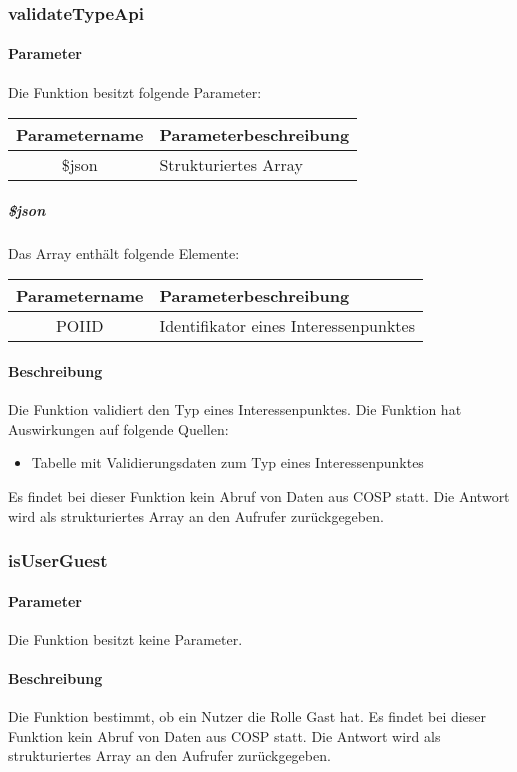 \subsubsection{validateTypeApi}
\paragraph{Parameter} Die Funktion besitzt folgende Parameter:
\begin{table}[H]
	\begin{tabular}{|c|p{11cm}|}
		\hline
		\textbf{Parametername} & \textbf{Parameterbeschreibung} \\ \hline
		\$json & Strukturiertes Array \\ \hline
	\end{tabular}
\end{table}
\subparagraph{\$json}Das Array enthält folgende Elemente:
\begin{table}[H]
	\begin{tabular}{|c|p{11cm}|}
		\hline
		\textbf{Parametername} & \textbf{Parameterbeschreibung} \\ \hline
		POIID & Identifikator eines Interessenpunktes \\ \hline
	\end{tabular}
\end{table}
\paragraph{Beschreibung} Die Funktion validiert den Typ eines Interessenpunktes. Die Funktion hat Auswirkungen auf folgende Quellen:
\begin{itemize}
	\item Tabelle mit Validierungsdaten zum Typ eines Interessenpunktes
\end{itemize}
Es findet bei dieser Funktion kein Abruf von Daten aus {\glqq COSP\grqq} statt. Die Antwort wird als strukturiertes Array an den Aufrufer zurückgegeben.
\subsubsection{isUserGuest}
\paragraph{Parameter} Die Funktion besitzt keine Parameter.
\paragraph{Beschreibung} Die Funktion bestimmt, ob ein Nutzer die Rolle {\glqq Gast\grqq} hat. Es findet bei dieser Funktion kein Abruf von Daten aus {\glqq COSP\grqq} statt. Die Antwort wird als strukturiertes Array an den Aufrufer zurückgegeben.
